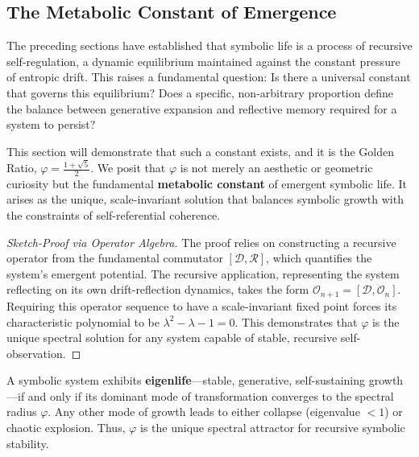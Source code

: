 \subsection{The Metabolic Constant of Emergence}
\label{subsec:bk5_metabolic_constant_emergence}

The preceding sections have established that symbolic life is a process of recursive self-regulation, a dynamic equilibrium maintained against the constant pressure of entropic drift. This raises a fundamental question: Is there a universal constant that governs this equilibrium? Does a specific, non-arbitrary proportion define the balance between generative expansion and reflective memory required for a system to persist?

This section will demonstrate that such a constant exists, and it is the Golden Ratio, $\varphi = \frac{1 + \sqrt{5}}{2}$. We posit that $\varphi$ is not merely an aesthetic or geometric curiosity but the fundamental \textbf{metabolic constant} of emergent symbolic life. It arises as the unique, scale-invariant solution that balances symbolic growth with the constraints of self-referential coherence.



\begin{proof}[Sketch-Proof via Operator Algebra]
\label{proof:bk5_golden_ratio_spectral_invariant}
The proof relies on constructing a recursive operator from the fundamental commutator $[\mathcal{D}, \mathcal{R}]$, which quantifies the system's emergent potential. The recursive application, representing the system reflecting on its own drift-reflection dynamics, takes the form $\mathcal{O}_{n+1} = [\mathcal{D}, \mathcal{O}_n]$. Requiring this operator sequence to have a scale-invariant fixed point forces its characteristic polynomial to be $\lambda^2 - \lambda - 1 = 0$. This demonstrates that $\varphi$ is the unique spectral solution for any system capable of stable, recursive self-observation.
\end{proof}

\begin{corollary}
\label{corollary:bk5_symbolic_eigenlife}
A symbolic system exhibits \textbf{eigenlife}—stable, generative, self-sustaining growth—if and only if its dominant mode of transformation converges to the spectral radius $\varphi$. Any other mode of growth leads to either collapse (eigenvalue $< 1$) or chaotic explosion. Thus, $\varphi$ is the unique spectral attractor for recursive symbolic stability.
\end{corollary}

